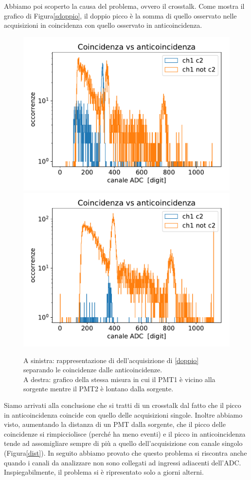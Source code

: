 
Abbiamo poi scoperto la causa del problema, ovvero il crosstalk.
Come mostra il grafico di Figura\autoref{sdoppio}, il doppio picco è la somma di quello osservato nelle acquisizioni in coincidenza con quello osservato in anticoincidenza. 

\begin{figure}[h]
\centering
\subfloat
{
\includegraphics[width=18 em]{immagini/sdoppio}
\label{sdoppio}
}
\subfloat
{
\includegraphics[width=18 em]{immagini/dist}
\label{dist}
}

\caption{A sinistra: rappresentazione di dell'acquisizione di \autoref{doppio} separando le coincidenze dalle anticoincidenze. \\
A destra: grafico della stessa misura in cui il PMT1 è vicino alla sorgente mentre il PMT2 è lontano dalla sorgente.}

\end{figure}

Siamo arrivati alla conclusione che si tratti di un crosstalk dal fatto che il picco in anticoincidenza coincide con quello delle acquisizioni singole.
Inoltre abbiamo visto, aumentando la distanza di un PMT dalla sorgente, che il picco delle coincidenze si rimpicciolisce (perché ha meno eventi) e il picco in anticoincidenza tende ad assomigliare sempre di più a quello dell'acquisizione con canale singolo (Figura\autoref{dist}).
In seguito abbiamo provato che questo problema si riscontra anche quando i canali da analizzare non sono collegati ad ingressi adiacenti dell'ADC. Inspiegabilmente, il problema si è ripresentato solo a giorni alterni. 
